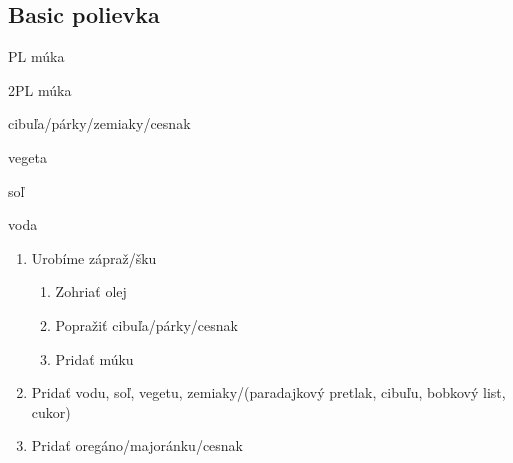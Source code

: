 \setcounter{step}{0}
\subsection{Basic polievka}

\begin{ingredient}
\def\portions{2}%

\begin{main}
	\item PL múka
	\item 2PL múka
	\item cibuľa/párky/zemiaky/cesnak
	\item vegeta
	\item soľ
	\item voda
\end{main}
\end{ingredient}
\begin{recipe}

\begin{enumerate}

\item{Urobíme zápraž/šku}
\begin{enumerate}
\item{Zohriať olej}
\item{Popražiť cibuľa/párky/cesnak}
\item{Pridať múku}
\end{enumerate}
\item{Pridať vodu, soľ, vegetu, zemiaky/(paradajkový pretlak, cibuľu, bobkový list, cukor)}
\item{Pridať oregáno/majoránku/cesnak}


\end{enumerate}
\end{recipe}

\begin{notes}

\end{notes}
\clearpage	
